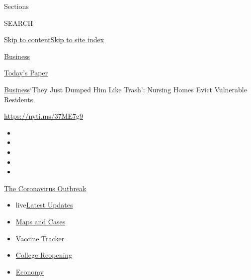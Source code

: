 Sections

SEARCH

\protect\hyperlink{site-content}{Skip to
content}\protect\hyperlink{site-index}{Skip to site index}

\href{https://www.nytimes3xbfgragh.onion/section/business}{Business}

\href{https://myaccount.nytimes3xbfgragh.onion/auth/login?response_type=cookie\&client_id=vi}{}

\href{https://www.nytimes3xbfgragh.onion/section/todayspaper}{Today's
Paper}

\href{/section/business}{Business}\textbar{}`They Just Dumped Him Like
Trash': Nursing Homes Evict Vulnerable Residents

\url{https://nyti.ms/37ME7g9}

\begin{itemize}
\item
\item
\item
\item
\item
\end{itemize}

\href{https://www.nytimes3xbfgragh.onion/news-event/coronavirus?action=click\&pgtype=Article\&state=default\&region=TOP_BANNER\&context=storylines_menu}{The
Coronavirus Outbreak}

\begin{itemize}
\tightlist
\item
  live\href{https://www.nytimes3xbfgragh.onion/2020/08/03/world/coronavirus-covid-19.html?action=click\&pgtype=Article\&state=default\&region=TOP_BANNER\&context=storylines_menu}{Latest
  Updates}
\item
  \href{https://www.nytimes3xbfgragh.onion/interactive/2020/us/coronavirus-us-cases.html?action=click\&pgtype=Article\&state=default\&region=TOP_BANNER\&context=storylines_menu}{Maps
  and Cases}
\item
  \href{https://www.nytimes3xbfgragh.onion/interactive/2020/science/coronavirus-vaccine-tracker.html?action=click\&pgtype=Article\&state=default\&region=TOP_BANNER\&context=storylines_menu}{Vaccine
  Tracker}
\item
  \href{https://www.nytimes3xbfgragh.onion/2020/08/02/us/covid-college-reopening.html?action=click\&pgtype=Article\&state=default\&region=TOP_BANNER\&context=storylines_menu}{College
  Reopening}
\item
  \href{https://www.nytimes3xbfgragh.onion/live/2020/08/03/business/stock-market-today-coronavirus?action=click\&pgtype=Article\&state=default\&region=TOP_BANNER\&context=storylines_menu}{Economy}
\end{itemize}

